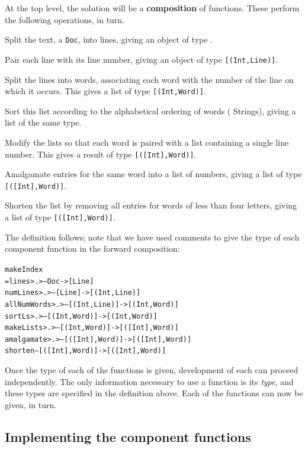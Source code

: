 At the top level, the solution will be a
{\bf composition} of functions. 
 These perform the following operations, in
turn.
\begin{titemize}
\item Split the text, a \texttt{Doc}, into lines, giving an object of type {\mi
[Line]}. 
\item Pair each line with its line number, giving an object of type
\texttt{[(Int,Line)]}.
\item Split the lines into words, associating each word with the number of the
line on which it occurs. This gives a list of type \texttt{[(Int,Word)]}.
\item Sort this list according to the alphabetical ordering of words ({\mi
String}s), giving
a list of the same type.
\item Modify the lists so that each word is paired with a list containing a 
single line number. This gives a result of type \texttt{[([Int],Word)]}.
\item Amalgamate entries for the same word into a list of numbers, giving a
list
of type \texttt{[([Int],Word)]}.
\item Shorten the list by removing all entries for words of less than four
letters, giving a list of type \texttt{[([Int],Word)]}.
\end{titemize}
The definition follows; note that we have used comments to give the type of
each component function in the forward composition:
\begin{alltt}
makeIndex
  = lines       >.>     --   Doc            -> [Line]
    numLines    >.>     --   [Line]         -> [(Int,Line)] 
    allNumWords >.>     --   [(Int,Line)]   -> [(Int,Word)]
    sortLs      >.>     --   [(Int,Word)]   -> [(Int,Word)]
    makeLists   >.>     --   [(Int,Word)]   -> [([Int],Word)]
    amalgamate  >.>     --   [([Int],Word)] -> [([Int],Word)]
    shorten             --   [([Int],Word)] -> [([Int],Word)]
\end{alltt}
Once the type of each of the functions is given, development of each can 
proceed independently. The only information necessary to use a function
is its {\em type}, and these types are specified in the definition above.
Each of the functions can now be given, in turn. 

\subsection*{Implementing the component functions}
 
